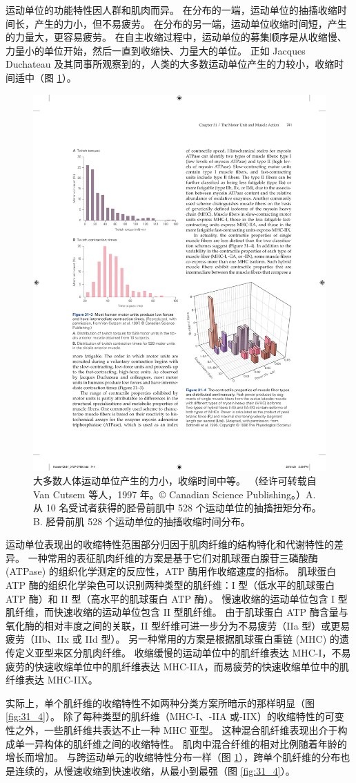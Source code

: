 运动单位的功能特性因人群和肌肉而异。
在分布的一端，运动单位的抽搐收缩时间长，产生的力小，但不易疲劳。
在分布的另一端，运动单位收缩时间短，产生的力量大，更容易疲劳。
在自主收缩过程中，运动单位的募集顺序是从收缩慢、力量小的单位开始，然后一直到收缩快、力量大的单位。 
正如 Jacques Duchateau 及其同事所观察到的，人类的大多数运动单位产生的力较小，收缩时间适中（图 \ref{fig:31_3}）。


\begin{figure}[htbp]
	\centering
	\includegraphics[width=0.5\linewidth]{chap31/fig_31_3}
	\caption{大多数人体运动单位产生的力小，收缩时间中等。 （经许可转载自 Van Cutsem 等人，1997 年。© Canadian Science Publishing。）A. 从 10 名受试者获得的胫骨前肌中 528 个运动单位的抽搐扭矩分布。 B. 胫骨前肌 528 个运动单位的抽搐收缩时间分布。}
	\label{fig:31_3}
\end{figure}


运动单位表现出的收缩特性范围部分归因于肌肉纤维的结构特化和代谢特性的差异。
一种常用的表征肌肉纤维的方案是基于它们对肌球蛋白腺苷三磷酸酶 (ATPase) 的组织化学测定的反应性，ATP 酶用作收缩速度的指标。
肌球蛋白 ATP 酶的组织化学染色可以识别两种类型的肌纤维：I 型（低水平的肌球蛋白 ATP 酶）和 II 型（高水平的肌球蛋白 ATP 酶）。
慢速收缩的运动单位包含 I 型肌纤维，而快速收缩的运动单位包含 II 型肌纤维。
由于肌球蛋白 ATP 酶含量与氧化酶的相对丰度之间的关联，II 型纤维可进一步分为不易疲劳（IIa 型）或更易疲劳（IIb、IIx 或 IId 型）。
另一种常用的方案是根据肌球蛋白重链 (MHC) 的遗传定义亚型来区分肌肉纤维。
收缩缓慢的运动单位中的肌纤维表达 MHC-I，不易疲劳的快速收缩单位中的肌纤维表达 MHC-IIA，而易疲劳的快速收缩单位中的肌纤维表达 MHC-IIX。


实际上，单个肌纤维的收缩特性不如两种分类方案所暗示的那样明显（图 \ref{fig:31_4}）。
除了每种类型的肌纤维（MHC-I、-IIA 或-IIX）的收缩特性的可变性之外，一些肌纤维共表达不止一种 MHC 亚型。
这种混合肌纤维表现出介于构成单一异构体的肌纤维之间的收缩特性。
肌肉中混合纤维的相对比例随着年龄的增长而增加。
与跨运动单元的收缩特性分布一样（图 \ref{fig:31_3}），跨单个肌纤维的分布也是连续的，从慢速收缩到快速收缩，从最小到最强（图 \ref{fig:31_4}）。


